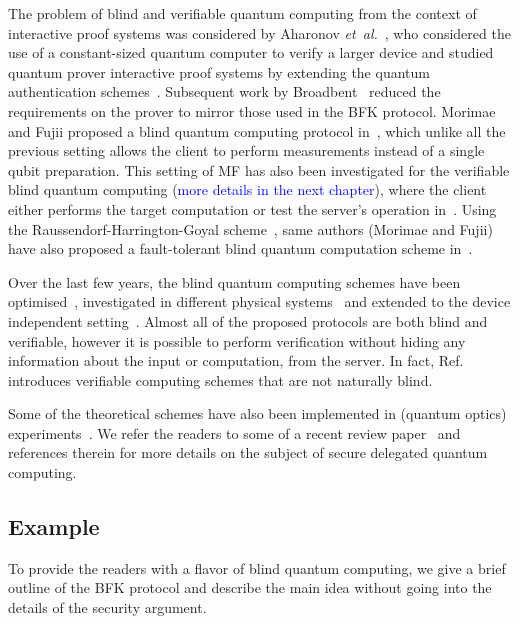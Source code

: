 The problem of blind and verifiable quantum computing from the context of interactive proof systems was considered by Aharonov \emph{et~al.}~\cite{aharonov2008interactive, aharonov2017interactive}, who considered the use of a constant-sized quantum computer to verify a larger device and studied quantum prover interactive proof systems by extending the quantum authentication schemes~\cite{barnum2002authentication}. Subsequent work by Broadbent~\cite{broadbent2015verify} reduced the requirements on the prover to mirror those used in the BFK protocol. Morimae and Fujii proposed a blind quantum computing protocol in~\cite{morimae2012blind}, which unlike all the previous setting allows the client to perform measurements instead of a single qubit preparation. This setting of MF has also been investigated for the verifiable blind quantum computing (\textcolor{blue}{more details in the next chapter}), where the client either performs the target computation or test the server's operation in~\cite{morimae2014verification,hayashi2015verifiable,hayashi2016self, takeuchi2018verification, takeuchi2018resource}.  Using the Raussendorf-Harrington-Goyal scheme~\cite{raussendorf2006fault, raussendorf2007fault, raussendorf2007topological}, same authors (Morimae and Fujii) have also proposed a fault-tolerant blind quantum computation scheme in~\cite{morimae2012blind}.
 
Over the last few years, the blind quantum computing schemes have been optimised~\cite{mantri2013optimal, giovannetti2013efficient, perez2015iterated}, investigated in different physical systems~\cite{morimae2012continuous, dunjko2012blind, liu2018client} and extended to the device independent setting~\cite{hajdusek2015device, gheorghiu2015rigidity, coladangelo2017verifier}. Almost all of the proposed protocols are both blind and verifiable, however it is possible to perform verification without hiding any information about the input or computation, from the server. In fact, Ref.~\cite{fitzsimons2018post, mahadev2018classical} introduces verifiable computing schemes that are not naturally blind. 

Some of the theoretical schemes have also been implemented in (quantum optics) experiments~\cite{barz2012demonstration, barz2013experimental, greganti2016demonstration}. We refer the readers to some of a recent review paper~\cite{fitzsimons2016private} and references therein for more details on the subject of secure delegated quantum computing.

\subsection{Example}
To provide the readers with a flavor of blind quantum computing, we give a brief outline of the BFK protocol and describe the main idea without going into the details of the security argument.

